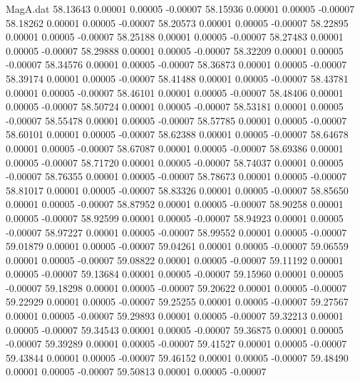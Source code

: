 \begin{filecontents}{MagA.dat}
  58.13643    0.00001    0.00005   -0.00007
  58.15936    0.00001    0.00005   -0.00007
  58.18262    0.00001    0.00005   -0.00007
  58.20573    0.00001    0.00005   -0.00007
  58.22895    0.00001    0.00005   -0.00007
  58.25188    0.00001    0.00005   -0.00007
  58.27483    0.00001    0.00005   -0.00007
  58.29888    0.00001    0.00005   -0.00007
  58.32209    0.00001    0.00005   -0.00007
  58.34576    0.00001    0.00005   -0.00007
  58.36873    0.00001    0.00005   -0.00007
  58.39174    0.00001    0.00005   -0.00007
  58.41488    0.00001    0.00005   -0.00007
  58.43781    0.00001    0.00005   -0.00007
  58.46101    0.00001    0.00005   -0.00007
  58.48406    0.00001    0.00005   -0.00007
  58.50724    0.00001    0.00005   -0.00007
  58.53181    0.00001    0.00005   -0.00007
  58.55478    0.00001    0.00005   -0.00007
  58.57785    0.00001    0.00005   -0.00007
  58.60101    0.00001    0.00005   -0.00007
  58.62388    0.00001    0.00005   -0.00007
  58.64678    0.00001    0.00005   -0.00007
  58.67087    0.00001    0.00005   -0.00007
  58.69386    0.00001    0.00005   -0.00007
  58.71720    0.00001    0.00005   -0.00007
  58.74037    0.00001    0.00005   -0.00007
  58.76355    0.00001    0.00005   -0.00007
  58.78673    0.00001    0.00005   -0.00007
  58.81017    0.00001    0.00005   -0.00007
  58.83326    0.00001    0.00005   -0.00007
  58.85650    0.00001    0.00005   -0.00007
  58.87952    0.00001    0.00005   -0.00007
  58.90258    0.00001    0.00005   -0.00007
  58.92599    0.00001    0.00005   -0.00007
  58.94923    0.00001    0.00005   -0.00007
  58.97227    0.00001    0.00005   -0.00007
  58.99552    0.00001    0.00005   -0.00007
  59.01879    0.00001    0.00005   -0.00007
  59.04261    0.00001    0.00005   -0.00007
  59.06559    0.00001    0.00005   -0.00007
  59.08822    0.00001    0.00005   -0.00007
  59.11192    0.00001    0.00005   -0.00007
  59.13684    0.00001    0.00005   -0.00007
  59.15960    0.00001    0.00005   -0.00007
  59.18298    0.00001    0.00005   -0.00007
  59.20622    0.00001    0.00005   -0.00007
  59.22929    0.00001    0.00005   -0.00007
  59.25255    0.00001    0.00005   -0.00007
  59.27567    0.00001    0.00005   -0.00007
  59.29893    0.00001    0.00005   -0.00007
  59.32213    0.00001    0.00005   -0.00007
  59.34543    0.00001    0.00005   -0.00007
  59.36875    0.00001    0.00005   -0.00007
  59.39289    0.00001    0.00005   -0.00007
  59.41527    0.00001    0.00005   -0.00007
  59.43844    0.00001    0.00005   -0.00007
  59.46152    0.00001    0.00005   -0.00007
  59.48490    0.00001    0.00005   -0.00007
  59.50813    0.00001    0.00005   -0.00007

\end{filecontents}
